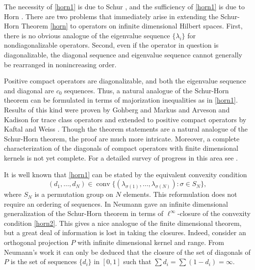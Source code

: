 \documentclass[12pt]{amsart}
\newcounter{Theorem}
\numberwithin{equation}{section}
\numberwithin{Theorem}{section}
\theoremstyle{plain}
\theoremstyle{definition}
\theoremstyle{remark}
\begin{document}
The necessity of \eqref{horn1} is due to Schur \cite{schur}, and the sufficiency of \eqref{horn1} is due to Horn \cite{horn}. 
There are two problems that immediately arise in extending the Schur-Horn Theorem \ref{horn} to operators on infinite dimensional Hilbert spaces. First, there is no obvious analogue of the eigenvalue sequence $\{\lambda_{i}\}$ for nondiagonalizable operators. Second, even if the operator in question is diagonalizable, the diagonal sequence and eigenvalue sequence cannot generally be rearranged in nonincreasing order.

Positive compact operators are diagonalizable, and both the eigenvalue sequence and diagonal are $c_{0}$ sequences. Thus, a natural analogue of the Schur-Horn theorem can be formulated in terms of majorization inequalities as in \eqref{horn1}. Results of this kind were proven by Gohberg and Markus \cite{gm} and Arveson and Kadison \cite{ak} for trace class operators and extended to positive compact operators by Kaftal and Weiss \cite{kw}. Though the theorem statements are a natural analogue of the Schur-Horn theorem, the proof are much more intricate. Moreover, a complete characterization of the diagonals of compact operators with finite dimensional kernels is not yet complete. For a detailed survey of progress in this area see \cite{kw0}.

It is well known that \eqref{horn1} can be stated by the equivalent convexity condition
\begin{equation}\label{horn2}
(d_1,\ldots,d_N) \in \operatorname{conv} \{ (\lambda_{\sigma(1)},\ldots,\lambda_{\sigma(N)}): \sigma \in S_N\},
\end{equation}
where $S_N$ is a permutation group on $N$ elements. This reformulation does not require an ordering of sequences. In \cite{neu} Neumann gave an infinite dimensional generalization of the Schur-Horn theorem in terms of $\ell^\infty$-closure of the convexity condition \eqref{horn2}. This gives a nice analogue of the finite dimensional theorem, but a great deal of information is lost in taking the closures. Indeed, consider an orthogonal projection $P$ with infinite dimensional kernel and range. From Neumann's work it can only be deduced that the closure of the set of diagonals of $P$ is the set of sequences $\{d_{i}\}$ in $[0,1]$ such that $\sum d_{i} = \sum (1-d_{i})=\infty$. 
\end{document}

